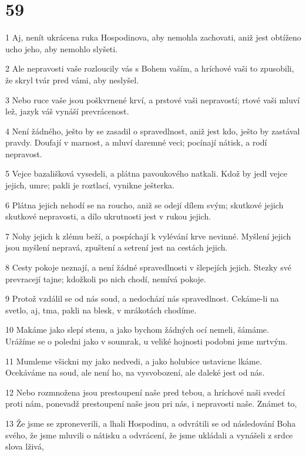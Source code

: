 \chapter{59}

\par 1 Aj, nenít ukrácena ruka Hospodinova, aby nemohla zachovati, aniž jest obtíženo ucho jeho, aby nemohlo slyšeti.
\par 2 Ale nepravosti vaše rozloucily vás s Bohem vaším, a hríchové vaši to zpusobili, že skryl tvár pred vámi, aby neslyšel.
\par 3 Nebo ruce vaše jsou poškvrnené krví, a prstové vaši nepravostí; rtové vaši mluví lež, jazyk váš vynáší prevrácenost.
\par 4 Není žádného, ješto by se zasadil o spravedlnost, aniž jest kdo, ješto by zastával pravdy. Doufají v marnost, a mluví daremné veci; pocínají nátisk, a rodí nepravost.
\par 5 Vejce bazališková vysedeli, a plátna pavoukového natkali. Kdož by jedl vejce jejich, umre; pakli je roztlací, vynikne ješterka.
\par 6 Plátna jejich nehodí se na roucho, aniž se odejí dílem svým; skutkové jejich skutkové nepravosti, a dílo ukrutnosti jest v rukou jejich.
\par 7 Nohy jejich k zlému beží, a pospíchají k vylévání krve nevinné. Myšlení jejich jsou myšlení nepravá, zpuštení a setrení jest na cestách jejich.
\par 8 Cesty pokoje neznají, a není žádné spravedlnosti v šlepejích jejich. Stezky své prevracejí tajne; kdožkoli po nich chodí, nemívá pokoje.
\par 9 Protož vzdálil se od nás soud, a nedochází nás spravedlnost. Cekáme-li na svetlo, aj, tma, pakli na blesk, v mrákotách chodíme.
\par 10 Makáme jako slepí stenu, a jako bychom žádných ocí nemeli, šámáme. Urážíme se o poledni jako v soumrak, u veliké hojnosti podobni jsme mrtvým.
\par 11 Mumleme všickni my jako nedvedi, a jako holubice ustavicne lkáme. Ocekáváme na soud, ale není ho, na vysvobození, ale daleké jest od nás.
\par 12 Nebo rozmnožena jsou prestoupení naše pred tebou, a hríchové naši svedcí proti nám, ponevadž prestoupení naše jsou pri nás, i nepravosti naše. Známet to,
\par 13 Že jsme se zproneverili, a lhali Hospodinu, a odvrátili se od následování Boha svého, že jsme mluvili o nátisku a odvrácení, že jsme ukládali a vynášeli z srdce slova lživá,
